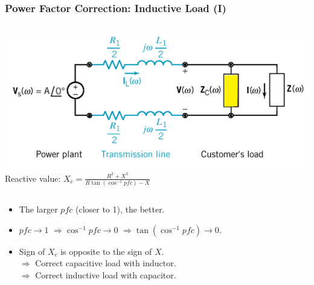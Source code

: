 \documentclass{beamer}
\begin{document}
\begin{frame}[fragile]
\frametitle{Power Factor Correction: Inductive Load (I)}

\vspace{-0.5cm}

\begin{columns}[c]
\includegraphics[width=\textwidth]{src/pfc0.png}
%
Reactive value:
$X_c = \frac{R^2 + X^2}{R \tan(\cos^{-1} pfc) - X}$
\end{columns}

\begin{itemize}
\item The larger $pfc$ (closer to 1), the better.
\item $pfc \rightarrow 1$ 
$\Rightarrow \cos^{-1} pfc \rightarrow 0$ 
$\Rightarrow \tan(\cos^{-1} pfc) \rightarrow 0$.
\item Sign of $X_c$ is opposite to the sign of $X$.
\\
$\Rightarrow$ Correct capacitive load with inductor. 
\\
$\Rightarrow$ Correct inductive load with capacitor.
\end{itemize}

\end{frame}

\end{document}

